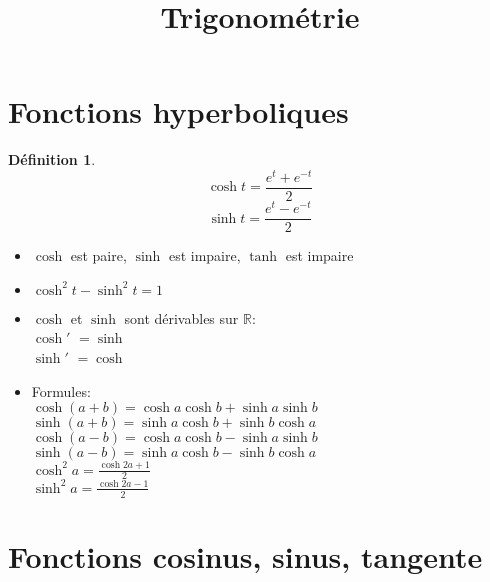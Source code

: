 \documentclass[fleqn]{article}
\title{Trigonom\'etrie}
\date{}
\theoremstyle{definition} \newtheorem*{defi}{D\'efinition}
\theoremstyle{definition} \newtheorem*{theo}{Th\'eor\`eme}
\begin{document}
\maketitle

\section{Fonctions hyperboliques}
\begin{defi} $\ $
		\[ \cosh t = \frac{e^t + e^{-t}}{2} \]
		\[ \sinh t = \frac{e^t - e^{-t}}{2} \]
\end{defi}

\begin{itemize}
	\item $\cosh$ est paire, $\sinh$ est impaire, $\tanh$ est impaire
	\item $ \cosh^2 t - \sinh^2 t = 1 $
	\item $\cosh$ et $\sinh$ sont d\'{e}rivables sur $\mathbb{R}$: \\
		$\cosh'$ $ = \sinh$ \\
		$\sinh'$ $ = \cosh$
	\item Formules: \\
		$\cosh (a+b) = \cosh a\cosh b + \sinh a\sinh b$ \\
		$\sinh (a+b) = \sinh a\cosh b + \sinh b\cosh a$ \\
		$\cosh (a-b) = \cosh a\cosh b - \sinh a\sinh b$ \\
		$\sinh (a-b) = \sinh a\cosh b - \sinh b\cosh a$ \\
		$\cosh^2 a = \frac{\cosh 2a + 1}{2}$ \\
		$\sinh^2 a = \frac{\cosh 2a - 1}{2}$ \\
\end{itemize}

\section{Fonctions cosinus, sinus, tangente}
\end{document}

